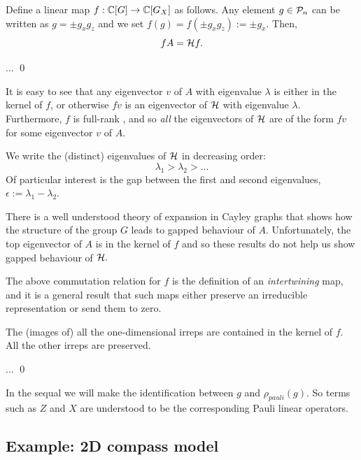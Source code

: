 \documentclass[12pt,notitlepage,longbibliography,nofootinbib,tightenlines]{revtex4}
\begin{document}
Define a linear map $f:\mathbb{C}[G]\to\mathbb{C}[G_X]$ as follows.
Any element $g\in \mathcal{P}_n$ can be written as $g = \pm g_x g_z$
and we set $f(g) = f(\pm g_x g_z) := \pm g_x.$
Then,
$$
    f A = \mathcal{H} f.
$$

 \Proveit ...
\qed

It is easy to see that any eigenvector $v$ of $A$
with eigenvalue $\lambda$
is either in the kernel of $f$, or otherwise $fv$
is an eigenvector of $\mathcal{H}$ with eigenvalue $\lambda.$
Furthermore, $f$ is full-rank \Proveit, and so {\it all} the eigenvectors
of $\mathcal{H}$ are of the form $fv$ for some eigenvector $v$ of $A.$

We write the (distinct) eigenvalues of $\mathcal{H}$ in decreasing
order:
$$ \lambda_1 > \lambda_2 > ... $$
Of particular interest is the gap between the first
and second eigenvalues,
$\epsilon := \lambda_1 - \lambda_2.$

There is a well understood theory of
expansion in Cayley graphs that shows how the
structure of the group $G$ leads to
gapped behaviour of $A.$
Unfortunately, the top eigenvector of $A$ is
in the kernel of $f$ and so these results
do not help us show gapped behaviour of $\mathcal{H}.$

The above commutation relation
for $f$ is the definition of an {\it intertwining} map,
and it is a general result that such maps either 
preserve an irreducible representation or send them to zero.

The (images of) all the one-dimensional irreps are contained in
the kernel of $f$. All the other irreps are preserved.

 \Proveit ...
\qed

In the sequal we will make the identification
between $g$ and $\rho_{pauli}(g)$.
So terms such as $Z$ and $X$ are understood
to be the corresponding Pauli linear operators.

\subsection{Example: 2D compass model}
\end{document}
